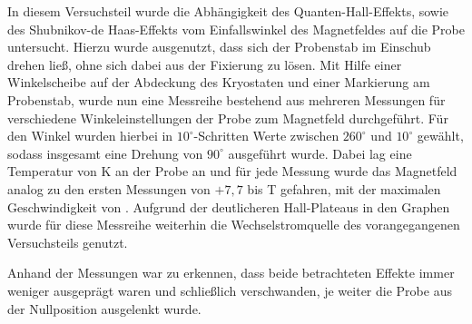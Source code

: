 
In diesem Versuchsteil wurde die Abhängigkeit des Quanten-Hall-Effekts, sowie des Shubnikov-de Haas-Effekts vom Einfallswinkel des Magnetfeldes auf die Probe untersucht. Hierzu wurde ausgenutzt, dass sich der Probenstab im Einschub drehen ließ, ohne sich dabei aus der Fixierung zu lösen. 
Mit Hilfe einer Winkelscheibe auf der Abdeckung des Kryostaten und einer Markierung am Probenstab, wurde nun eine Messreihe bestehend aus mehreren Messungen für verschiedene Winkeleinstellungen der Probe zum Magnetfeld durchgeführt. Für den Winkel wurden hierbei in $10^\circ$-Schritten Werte zwischen $260^\circ$ und $10^\circ$  gewählt, sodass insgesamt eine Drehung von $90^\circ$ ausgeführt wurde. Dabei lag eine Temperatur von \unit[2]{K} an der Probe an und für jede Messung wurde das Magnetfeld analog zu den ersten Messungen von $+7,7$ bis \unit[-7,7]{T} gefahren, mit der maximalen Geschwindigkeit von . Aufgrund der deutlicheren Hall-Plateaus in den Graphen wurde für diese Messreihe weiterhin die Wechselstromquelle des vorangegangenen Versuchsteils genutzt. 

Anhand der Messungen war zu erkennen, dass beide betrachteten Effekte immer weniger ausgeprägt waren und schließlich verschwanden, je weiter die Probe aus der Nullposition ausgelenkt wurde. 


